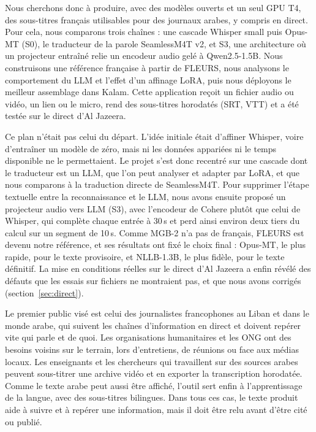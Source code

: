 \documentclass[10pt]{article}
\makeatletter
\renewcommand\subsection{\@startsection{subsection}{2}{0pt}{0.8ex plus .2ex}{0.3ex}{\normalfont\normalsize\bfseries}}
\makeatother
\begin{document}
Nous cherchons donc à produire, avec des modèles ouverts et un seul GPU T4, des sous-titres français utilisables pour des journaux arabes, y compris en direct. Pour cela, nous comparons trois chaînes : une cascade Whisper small puis Opus-MT (S0), le traducteur de la parole SeamlessM4T v2, et S3, une architecture où un projecteur entraîné relie un encodeur audio gelé à Qwen2.5-1.5B. Nous construisons une référence française à partir de FLEURS, nous analysons le comportement du LLM et l'effet d'un affinage LoRA, puis nous déployons le meilleur assemblage dans Kalam. Cette application reçoit un fichier audio ou vidéo, un lien ou le micro, rend des sous-titres horodatés (SRT, VTT) et a été testée sur le direct d'Al Jazeera.

Ce plan n'était pas celui du départ. L'idée initiale était d'affiner Whisper, voire d'entraîner un modèle de zéro, mais ni les données appariées ni le temps disponible ne le permettaient. Le projet s'est donc recentré sur une cascade dont le traducteur est un LLM, que l'on peut analyser et adapter par LoRA, et que nous comparons à la traduction directe de SeamlessM4T. Pour supprimer l'étape textuelle entre la reconnaissance et le LLM, nous avons ensuite proposé un projecteur audio vers LLM (S3), avec l'encodeur de Cohere plutôt que celui de Whisper, qui complète chaque entrée à 30\,s et perd ainsi environ deux tiers du calcul sur un segment de 10\,s. Comme MGB-2 n'a pas de français, FLEURS est devenu notre référence, et ses résultats ont fixé le choix final : Opus-MT, le plus rapide, pour le texte provisoire, et NLLB-1.3B, le plus fidèle, pour le texte définitif. La mise en conditions réelles sur le direct d'Al Jazeera a enfin révélé des défauts que les essais sur fichiers ne montraient pas, et que nous avons corrigés (section~\ref{sec:direct}).

\subsection{Cas d'usage}
Le premier public visé est celui des journalistes francophones au Liban et dans le monde arabe, qui suivent les chaînes d'information en direct et doivent repérer vite qui parle et de quoi. Les organisations humanitaires et les ONG ont des besoins voisins sur le terrain, lors d'entretiens, de réunions ou face aux médias locaux. Les enseignants et les chercheurs qui travaillent sur des sources arabes peuvent sous-titrer une archive vidéo et en exporter la transcription horodatée. Comme le texte arabe peut aussi être affiché, l'outil sert enfin à l'apprentissage de la langue, avec des sous-titres bilingues. Dans tous ces cas, le texte produit aide à suivre et à repérer une information, mais il doit être relu avant d'être cité ou publié.
\end{document}
